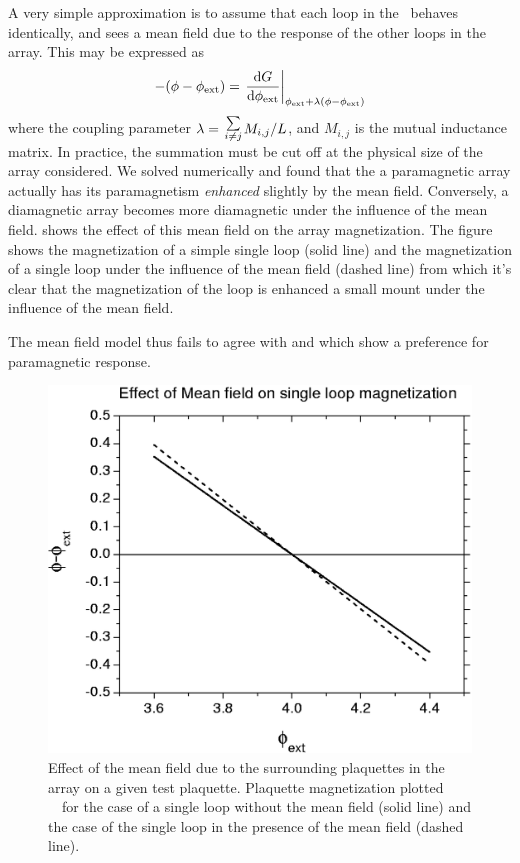 A very simple approximation is to assume that each loop
in the \jja\ behaves identically, and sees a mean field due to the
response of the other loops in the array. 
This may be expressed as 
%
\begin{equation}
\label{eqn:meanfield}
-(\phi-\phi_{\mathrm{ext}}) = \left. \frac{\mathrm{d} G}{\mathrm{d}\phi_{\mathrm{ext}}}\right|_{\phi_{\mathrm{ext}} + \lambda
(\phi-\phi_{\mathrm{ext}})}
\end{equation}
% 
where the coupling parameter $\lambda = {\sum \atop {i\ne j}} M_{i,j}/L$, 
and $M_{i,j}$ is the mutual inductance matrix. In practice, the summation
must be cut off at the physical size of the array considered. We solved 
 numerically and found that the a paramagnetic array
actually has its paramagnetism \emph{enhanced} slightly by the 
mean field. Conversely, a diamagnetic array becomes more diamagnetic
under the influence of the mean field.  shows the
effect of this mean field on the array magnetization. The figure 
shows the magnetization of a simple single loop (solid line) and
the magnetization of a single loop under the influence of the 
mean field (dashed line) from which it's clear that the magnetization of the
loop is enhanced a small mount under the influence of the mean 
field.

The mean field model thus fails to agree with  
and 
which show a preference for paramagnetic response.

%
%
\begin{figure}[p]
\includegraphics[width=5.7in]{figs/jjarray/chap2fig7.eps}
\caption[Effect of the mean field due to surrounding plaquettes in the array.]
{Effect of the mean field due to the surrounding plaquettes in the array on
a given test plaquette. Plaquette magnetization plotted \vs\ \phiext\
for the case of a single loop without the mean field (solid line) and
the case of the single loop in the presence of the mean field (dashed line).}
\label{fig:mean_field}
\end{figure}

